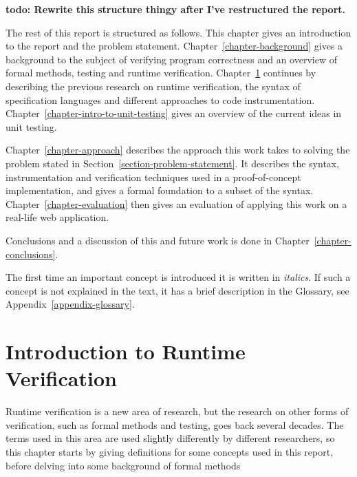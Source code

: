 \documentclass[a4paper,11pt]{kth-mag}
\newcommand{\todo}[1]{\textbf{todo: #1}}
\begin{document}
\todo{Rewrite this structure thingy after I've restructured the report.}

The rest of this report is structured as follows. This chapter gives an
introduction to the report and the problem statement.
Chapter~\ref{chapter-background} gives a background to the subject of verifying
program correctness and an overview of formal methods, testing and runtime
verification. Chapter~\ref{chapter-intro-to-rv} continues by describing the
previous research on runtime verification, the syntax of specification
languages and different approaches to code instrumentation.
Chapter~\ref{chapter-intro-to-unit-testing} gives an overview of the current
ideas in unit testing.

Chapter~\ref{chapter-approach} describes the approach this work takes to
solving the problem stated in Section~\ref{section-problem-statement}. It
describes the syntax, instrumentation and verification techniques used in a
proof-of-concept implementation, and gives a formal foundation to a subset of
the syntax. Chapter~\ref{chapter-evaluation} then gives an evaluation of
applying this work on a real-life web application.

Conclusions and a discussion of this and future work is done in
Chapter~\ref{chapter-conclusions}.

The first time an important concept is introduced it is written in
\textit{italics}. If such a concept is not explained in the text, it has a
brief description in the Glossary, see Appendix~\ref{appendix-glossary}.







\pagestyle{newchap}
\chapter{Introduction to Runtime Verification} \label{chapter-intro-to-rv}

Runtime verification is a new area of research, but the research on other forms
of verification, such as formal methods and testing, goes back several decades.
The terms used in this area are used slightly differently by different
researchers, so this chapter starts by giving definitions for some concepts
used in this report, before delving into some background of formal methods
\end{document}
